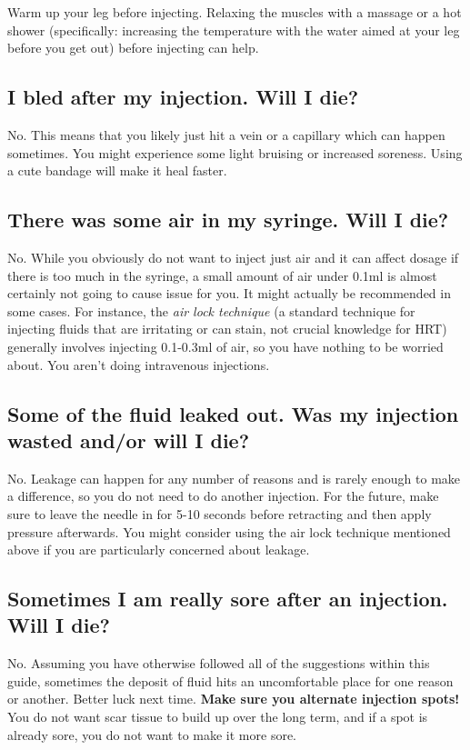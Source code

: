 \documentclass{article}
\begin{document}
Warm up your leg before injecting. Relaxing the muscles with a massage or a hot shower (specifically: increasing the temperature with the water aimed at your leg before you get out) before injecting can help.

\subsection{I bled after my injection. Will I die?}

No. This means that you likely just hit a vein or a capillary which can happen sometimes. You might experience some light bruising or increased soreness. Using a cute bandage will make it heal faster.

\subsection{There was some air in my syringe. Will I die?}\label{7-7}

No. While you obviously do not want to inject just air and it can affect dosage if there is too much in the syringe, a small amount of air under 0.1ml is almost certainly not going to cause issue for you. It might actually be recommended in some cases. For instance, the \textit{air lock technique} (a standard technique for injecting fluids that are irritating or can stain, not crucial knowledge for HRT) generally involves injecting 0.1-0.3ml of air, so you have nothing to be worried about. You aren’t doing intravenous injections.

\subsection{Some of the fluid leaked out. Was my injection wasted and/or will I die?}

No. Leakage can happen for any number of reasons and is rarely enough to make a difference, so you do not need to do another injection. For the future, make sure to leave the needle in for 5-10 seconds before retracting and then apply pressure afterwards. You might consider using the air lock technique mentioned above if you are particularly concerned about leakage.

\subsection{Sometimes I am really sore after an injection. Will I die?}

No. Assuming you have otherwise followed all of the suggestions within this guide, sometimes the deposit of fluid hits an uncomfortable place for one reason or another. Better luck next time. \textbf{Make sure you alternate injection spots!} You do not want scar tissue to build up over the long term, and if a spot is already sore, you do not want to make it more sore.
\end{document}
